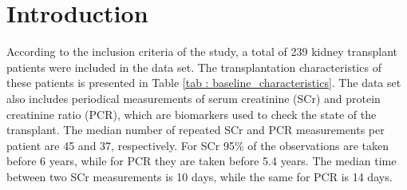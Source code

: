 \section{Introduction}
\label{sec : introduction}
According to the inclusion criteria of the study, a total of 239 kidney transplant patients were included in the data set. The transplantation characteristics of these patients is presented in Table \ref{tab : baseline_characteristics}. The data set also includes periodical measurements of serum creatinine (SCr) and protein creatinine ratio (PCR), which are biomarkers used to check the state of the transplant. The median number of repeated SCr and PCR measurements per patient are 45 and 37, respectively. For SCr 95\% of the observations are taken before 6 years, while for PCR they are taken before 5.4 years. The median time between two SCr measurements is 10 days, while the same for PCR is 14 days.

